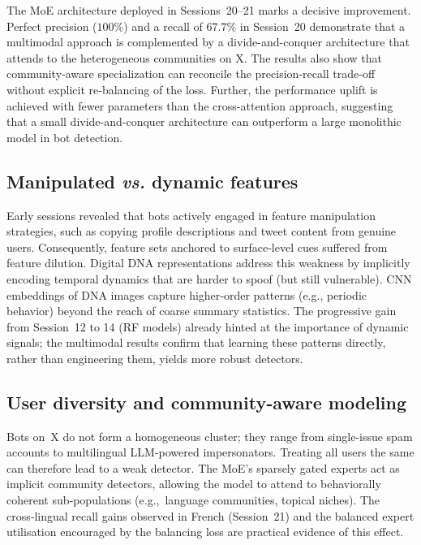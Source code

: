\documentclass[conference]{IEEEtran}
\begin{document}
The MoE architecture deployed in Sessions~20--21 marks a decisive improvement.
Perfect precision ($100\%$) and a recall of $67.7\%$ in Session~20 demonstrate 
that a multimodal approach is complemented by a
divide-and-conquer architecture that attends 
to the heterogeneous communities on X.
The results also show that community‑aware specialization can reconcile the precision‑recall trade‑off 
without explicit re‑balancing of the loss. Further, 
the performance uplift is achieved with fewer parameters than the 
cross-attention approach, suggesting 
that a small divide-and-conquer architecture can outperform 
a large monolithic model in bot detection.

\subsection{\textbf{Manipulated \emph{vs.} dynamic features}}
Early sessions revealed that bots actively 
engaged in feature manipulation strategies,
such as copying profile descriptions 
and tweet content from genuine users.
Consequently, feature sets anchored to surface‑level cues 
suffered from feature dilution.
Digital DNA representations address this weakness by implicitly encoding temporal dynamics
that are harder to spoof (but still vulnerable).
CNN embeddings of DNA images capture higher‑order patterns 
(e.g., periodic behavior) beyond the reach of coarse summary statistics.
The progressive gain from Session~12 to 14 (RF models) already hinted at 
the importance of dynamic signals; the multimodal results confirm that learning 
these patterns directly, rather than engineering them, yields more robust detectors.

\subsection{\textbf{User diversity and community‑aware modeling}}
Bots on~X do not form a homogeneous cluster; 
they range from single‑issue spam accounts to 
multilingual LLM‑powered impersonators.
Treating all users the same can therefore 
lead to a weak detector.
The MoE’s sparsely gated experts act as 
implicit community detectors, allowing the model 
to attend to behaviorally coherent sub‑populations 
(e.g.,\ language communities, topical niches).
The cross‑lingual recall gains observed in French 
(Session~21) and the balanced expert utilisation 
encouraged by the balancing loss are practical 
evidence of this effect.
\end{document}

